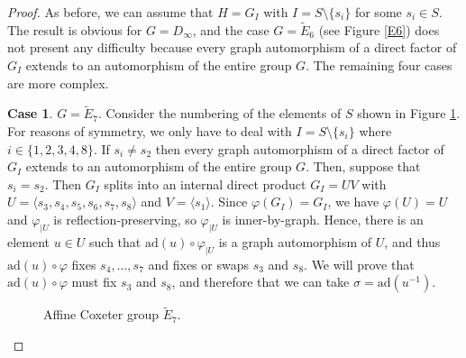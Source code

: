\documentclass[a4paper, 11pt]{amsart}
\theoremstyle{definition}
\theoremstyle{remark}
\begin{document}
\begin{proof}As before, we can assume that $H=G_I$ with $I= S\setminus \lbrace s_i\rbrace$ for some $s_i\in S$. The result is obvious for $G=D_{\infty}$, and the case $G=\tilde{E}_6$ (see Figure \ref{E6}) does not present any difficulty because every graph automorphism of a direct factor of $G_I$ extends to an automorphism of the entire group $G$. The remaining four cases are more complex.

\medskip
\noindent \textbf{Case 1}. $G=\tilde{E}_7$. 
\newline Consider the numbering of the elements of $S$ shown in Figure \ref{E7}. For reasons of symmetry, we only have to deal with $I=S\setminus \lbrace s_i\rbrace$ where $i\in \lbrace 1,2,3,4,8\rbrace$. If $s_i\neq s_2$ then every graph automorphism of a direct factor of $G_I$ extends to an automorphism of the entire group $G$. Then, suppose that $s_i=s_2$. Then $G_I$ splits into an internal direct product $G_I=UV$ with $U=\langle s_3,s_4,s_5,s_6,s_7,s_8\rangle$ and $V=\langle s_1\rangle$. Since $\varphi(G_I)=G_I$, we have $\varphi(U)=U$ and $\varphi_{\vert U}$ is reflection-preserving, so $\varphi_{\vert U}$ is inner-by-graph. Hence, there is an element $u\in U$ such that $\mathrm{ad}(u)\circ \varphi_{\vert U}$ is a graph automorphism of $U$, and thus $\mathrm{ad}(u)\circ \varphi$ fixes $s_4,\ldots,s_7$ and fixes or swaps $s_3$ and $s_8$. We will prove that $\mathrm{ad}(u)\circ \varphi$ must fix $s_3$ and $s_8$, and therefore that we can take $\sigma=\mathrm{ad}(u^{-1})$.

\begin{figure}[h!]
  \centering
  \caption{Affine Coxeter group $\tilde{E}_7$.}
  \label{E7}
\end{figure}


\end{proof}
\end{document}
